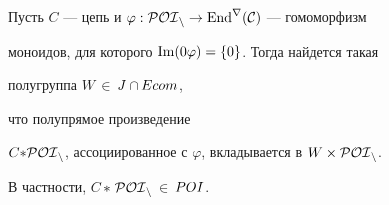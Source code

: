 \begin{lems} \label{odiv3}


Пусть $C$ --- цепь и $\varphi:\cal{POI}_n\rightarrow\operatorname{End}^r(C)$ --- гомоморфизм


моноидов, для которого $\operatorname{Im}(0\varphi)=\{0\}$. Тогда найдется такая


полугруппа $W$\,$\in$\,$\boldmath{J}$\,$\cap$\,$\boldmath{Ecom}$,


что полупрямое произведение


$C{*} \cal{POI}_n$, ассоциированное с $\varphi$, вкладывается в $W\times\cal{POI}_n$.


В частности, $C$\,${*}$\,$\cal{POI}_n$\,$\in$\,$\boldmath POI$.


\end{lems}






